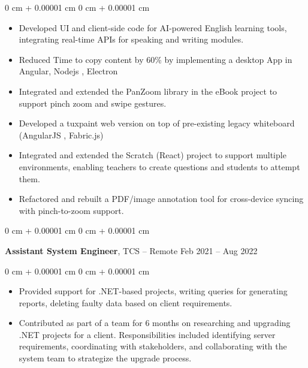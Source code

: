 \documentclass[10pt, letterpaper]{article}
\newenvironment{highlights}{
    \begin{itemize}[
        topsep=0.10 cm,
        parsep=0.10 cm,
        partopsep=0pt,
        itemsep=0pt,
        leftmargin=0 cm + 10pt
    ]
}{
    \end{itemize}
} %
\newenvironment{onecolentry}{
    \begin{adjustwidth}{
        0 cm + 0.00001 cm
    }{
        0 cm + 0.00001 cm
    }
}{
    \end{adjustwidth}
} %
\newenvironment{twocolentry}[2][]{
    \onecolentry
    \def\secondColumn{#2}
    \setcolumnwidth{\fill, 4.5 cm}
    \begin{paracol}{2}
}{
    \switchcolumn \raggedleft \secondColumn
    \end{paracol}
    \endonecolentry
} %
\begin{document}
		\vspace{0.10 cm}
		\begin{onecolentry}
			\begin{highlights}
				\item Developed UI and client-side code for AI-powered English learning tools, integrating real-time APIs for speaking and writing modules.
				\item Reduced Time to copy content by 60\% by implementing a desktop App in Angular, Nodejs , Electron
				\item Integrated and extended the PanZoom library in the eBook project to support pinch zoom and  swipe gestures.
				\item Developed a tuxpaint web version on top of pre-existing legacy whiteboard (AngularJS , Fabric.js)
				\item Integrated and extended the Scratch (React) project to support multiple environments, enabling teachers to create questions and students to attempt them.
				\item Refactored and rebuilt a PDF/image annotation tool for cross-device syncing with pinch-to-zoom support.
			\end{highlights}
		\end{onecolentry}
		\vspace{0.2 cm}

		\begin{twocolentry}{
				Feb 2021 – Aug 2022
			}
			\textbf{Assistant System Engineer}, TCS -- Remote \end{twocolentry}

			\vspace{0.10 cm}
			\begin{onecolentry}
				\begin{highlights}
					\item Provided support for .NET-based projects, writing queries for generating reports, deleting faulty data based on client requirements.
					\item Contributed as part of a team for 6 months on researching and upgrading .NET projects for a client. Responsibilities included identifying server requirements, coordinating with stakeholders, and collaborating with the system team to strategize the upgrade process.

				\end{highlights}
			\end{onecolentry}

			\vspace{0.2 cm}
\end{document}

